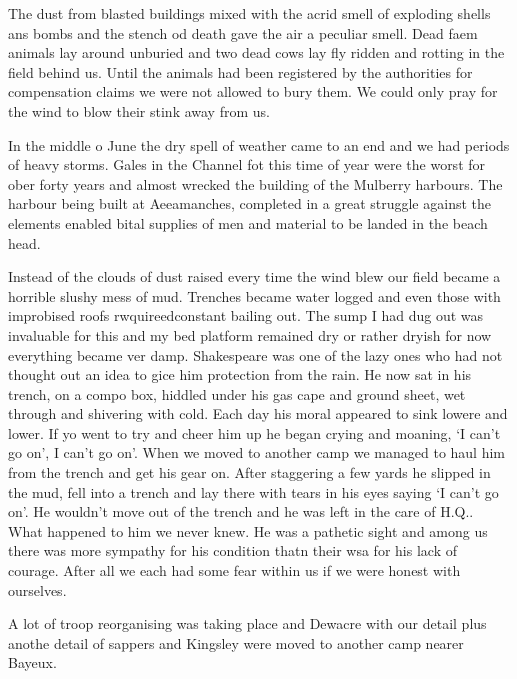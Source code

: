 The dust from blasted buildings mixed with the acrid smell of
exploding shells ans bombs and the stench od death gave the air a
peculiar smell. Dead faem animals lay around unburied and two dead
cows lay fly ridden and rotting in the field behind us. Until the
animals had been registered by the authorities for compensation claims
we were not allowed to bury them. We could only pray for the wind to
blow their stink away from us.

In the middle o June the dry spell of weather came to an end and we
had periods of heavy storms. Gales in the Channel fot this time of
year were the worst for ober forty years and almost wrecked the
building of the Mulberry harbours. The harbour being built at
Aeeamanches, completed in a great struggle against the elements
enabled bital supplies of men and material to be landed in the beach
head.

Instead of the clouds of dust raised every time the wind blew our
field became a horrible slushy mess of mud. Trenches became water
logged and even those with improbised roofs rwquireedconstant bailing
out. The sump I had dug out was invaluable for this and my bed
platform remained dry or rather dryish for now everything became ver
damp. Shakespeare was one of the lazy ones who had not thought out an
idea to gice him protection from the rain. He now sat in his trench,
on a compo box, hiddled under his gas cape and ground sheet, wet
through and shivering with cold. Each day his moral appeared to sink
lowere and lower. If yo went to try and cheer him up he began crying
and moaning, `I can't go on', I can't go on'. When we moved to another
camp we managed to haul him from the trench and get his gear on. After
staggering a few yards he slipped in the mud, fell into a trench and
lay there with tears in his eyes saying `I can't go on'. He wouldn't
move out of the trench and he was left in the care of H.Q.. What
happened to him we never knew. He was a pathetic sight and among us
there was more sympathy for his condition thatn their wsa for his lack
of courage. After all we each had some fear within us if we were
honest with ourselves.

A lot of troop reorganising was taking place and \lieutenant Dewacre with our
detail plus anothe detail of sappers and \lieutenant Kingsley were moved to
another camp nearer Bayeux.

